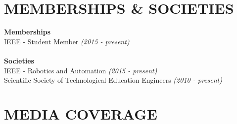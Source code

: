 \documentclass[11pt]{res} %
\begin{document}
\begin{resume}
\vspace{0.2in} %




\section{MEMBERSHIPS \& SOCIETIES}

\vspace{8pt} %

\small \textbf{Memberships}\\IEEE - Student Member {\sl (2015 - present)}
\\\\\small \textbf{Societies}\\IEEE - Robotics and Automation {\sl (2015 - present)}\\
Scientific Society of Technological Education Engineers {\sl (2010 - present)}

\vspace{0.2in} %



\section{MEDIA COVERAGE}

\vspace{8pt} %


\end{resume}
\end{document}
